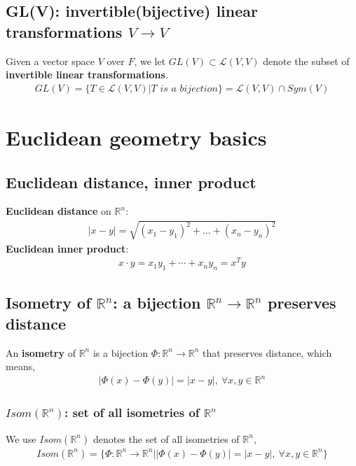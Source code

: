 \documentclass[11pt,a4paper]{article}
\begin{document}
\subsection{GL(V): invertible(bijective) linear transformations $V \rightarrow	V$}
Given a vector space $V$ over $F$, we let $GL(V ) \subset \mathcal{L}(V , V )$ denote the subset of \textbf{invertible linear transformations}.
\begin{equation}
    \begin{aligned}
        GL(V)=\{T\in \mathcal{L}(V , V )| T \textit{ is a bijection}\}=\mathcal{L}(V , V )\cap Sym(V)
    \end{aligned}
    \nonumber
\end{equation}

\section{Euclidean geometry basics}
\subsection{ Euclidean distance, inner product}
\textbf{Euclidean distance} on $\mathbb{R}^n$:
\begin{equation}
    \begin{aligned}
        |x-y|=\sqrt{(x_1-y_1)^2+...+(x_n-y_n)^2}
    \end{aligned}
    \nonumber
\end{equation}
\textbf{Euclidean inner product}:
\begin{equation}
    \begin{aligned}
        x\cdot y=x_1y_1+\cdots +x_ny_n=x^Ty
    \end{aligned}
    \nonumber
\end{equation}
\subsection{Isometry of $\mathbb{R}^n$: a bijection $\mathbb{R}^n \rightarrow \mathbb{R}^n$ preserves distance}
An \textbf{isometry} of $\mathbb{R}^n$ is a bijection $\varPhi :\mathbb{R}^n \rightarrow \mathbb{R}^n$ that preserves distance, which means,
\begin{equation}
    \begin{aligned}
        |\varPhi(x)-\varPhi(y)|=|x-y|,\ \forall x,y\in \mathbb{R}^n
    \end{aligned}
    \nonumber
\end{equation}
\subsubsection{$Isom(\mathbb{R}^n)$: set of all isometries of $\mathbb{R}^n$}
We use $Isom(\mathbb{R}^n)$ denotes the set of all isometries of $\mathbb{R}^n$,
\begin{equation}
    \begin{aligned}
        Isom(\mathbb{R}^n)=\{\varPhi:\mathbb{R}^n \rightarrow \mathbb{R}^n | |\varPhi(x)-\varPhi(y)|=|x-y|,\ \forall x,y\in \mathbb{R}^n\}
    \end{aligned}
    \nonumber
\end{equation}
\end{document}
